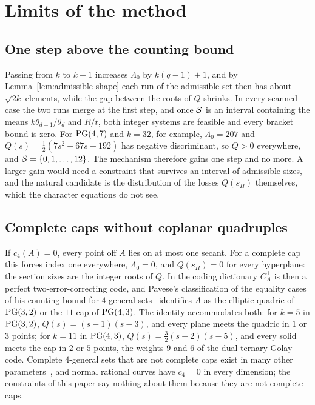 \section{Limits of the method}
\label{sec:limits}

\subsection{One step above the counting bound}

Passing from \(k\) to \(k+1\) increases \(\Lambda_0\) by \(k(q-1)+1\),
and by Lemma~\ref{lem:admissible-shape} each run of the admissible set
then has about \(\sqrt{2k}\) elements, while the gap between the roots
of \(Q\) shrinks.  In every scanned case the two runs merge at the first
step, and once \(\mathcal S\) is an interval containing the means \(k\theta_{d-1}/\theta_d\)
and \(R/t\), both integer systems are feasible and every bracket bound is
zero.  For \(\mathrm{PG}(4,7)\) and \(k=32\), for example, \(\Lambda_0=207\) and
\(Q(s)=\tfrac12(7s^2-67s+192)\) has negative discriminant, so \(Q>0\)
everywhere, and \(\mathcal S=\{0,1,\dots,12\}\).  The mechanism therefore gains
one step and no more.  A larger gain would need a constraint that
survives an interval of admissible sizes, and the natural candidate is
the distribution of the losses \(Q(s_\Pi)\) themselves, which the
character equations do not see.

\subsection{Complete caps without coplanar quadruples}

If \(c_4(A)=0\), every point off \(A\) lies on at most one secant.  For
a complete cap this forces index one everywhere, \(\Lambda_0=0\), and
\(Q(s_\Pi)=0\) for every hyperplane: the section sizes are the integer
roots of \(Q\).  In the coding dictionary \(C_A^\perp\) is then a perfect
two-error-correcting code, and Pavese's classification of the equality
cases of his counting bound for \(4\)-general
sets~\cite[Proposition~3.1]{Pavese2025} identifies \(A\) as the elliptic
quadric of \(\mathrm{PG}(3,2)\) or the \(11\)-cap of \(\mathrm{PG}(4,3)\).  The identity
accommodates both: for \(k=5\) in \(\mathrm{PG}(3,2)\), \(Q(s)=(s-1)(s-3)\), and
every plane meets the quadric in \(1\) or \(3\) points; for \(k=11\) in
\(\mathrm{PG}(4,3)\), \(Q(s)=\tfrac32(s-2)(s-5)\), and every solid meets the cap
in \(2\) or \(5\) points, the weights \(9\) and \(6\) of the dual ternary
Golay code.  Complete \(4\)-general sets that are not complete caps exist
in many other parameters~\cite[Section~5]{Pavese2025}, and normal
rational curves have \(c_4=0\) in every dimension; the constraints of
this paper say nothing about them because they are not complete caps.

